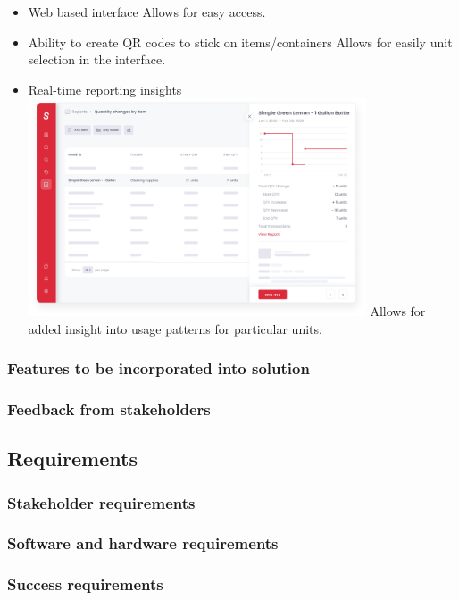 \documentclass{article}
\begin{document}
\begin{itemize}
    \item Web based interface
    \subitem Allows for easy access.

    \item Ability to create QR codes to stick on items/containers
    \subitem Allows for easily unit selection in the interface.

    \item Real-time reporting insights
    \subitem \includegraphics[width=10cm]{sortly_homepage_mockup_2.png}
    \subitem Allows for added insight into usage patterns for particular units.
\end{itemize}

\subsubsection{Features to be incorporated into solution}

\subsubsection{Feedback from stakeholders}

\subsection{Requirements}

\subsubsection{Stakeholder requirements}

\subsubsection{Software and hardware requirements}

\subsubsection{Success requirements}
\end{document}
